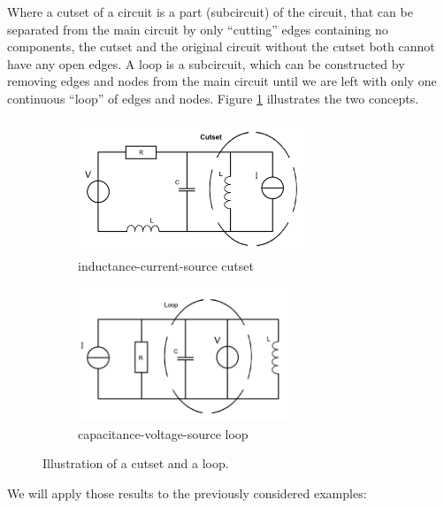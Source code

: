 Where a cutset of a circuit is a part (subcircuit) of the circuit, that can be separated from the main circuit by only ``cutting'' edges containing no components, the cutset and the original circuit without the cutset both cannot have any open edges. A loop is a subcircuit, which can be constructed by removing edges and nodes from the main circuit until we are left with only one continuous ``loop'' of edges and nodes. Figure \ref{fig:cutset and loop} illustrates the two concepts.

\begin{figure}[H]
	\begin{subfigure}{0.5\textwidth}
			\centering
			\includegraphics[height=4cm]{pictures/inductance-current-source_cutset.png}
			\caption{inductance-current-source cutset}
		\end{subfigure}
	\begin{subfigure}{0.5\textwidth}
			\centering
			\includegraphics[height=4cm]{pictures/capacitance-voltage-source_loop.png}
			\caption{capacitance-voltage-source loop}
		\end{subfigure}
	\caption{Illustration of a cutset and a loop.}
	\label{fig:cutset and loop}
\end{figure}

We will apply those results to the previously considered examples: 

